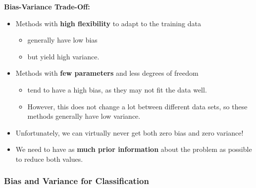  \textbf {Bias-Variance Trade-Off:}
  \begin{itemize}
    \item Methods with \textbf{high flexibility} to adapt to the training data
      \begin{itemize}
        \item generally have low bias
        \item but yield high variance.            
      \end{itemize}
    \item Methods with \textbf{few parameters} and less degrees of freedom 
      \begin{itemize}
        \item tend to have a high bias, as they may not fit the data well. 
        \item However, this does not change a lot between different data sets, so these methods generally have low variance.            
      \end{itemize}
    \item Unfortunately, we can virtually never get both zero bias and zero variance!       
    \item We need to have as \textbf{much prior information} about the problem as possible to reduce both values.
  \end{itemize}
  
\subsubsection {Bias and Variance for Classification}

